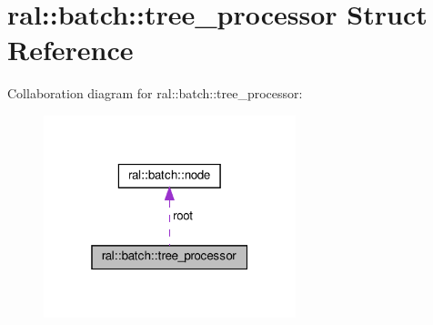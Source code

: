 \hypertarget{structral_1_1batch_1_1tree__processor}{}\section{ral\+:\+:batch\+:\+:tree\+\_\+processor Struct Reference}
\label{structral_1_1batch_1_1tree__processor}


Collaboration diagram for ral\+:\+:batch\+:\+:tree\+\_\+processor\+:\nopagebreak
\begin{figure}[H]
\begin{center}
\leavevmode
\includegraphics[width=208pt]{structral_1_1batch_1_1tree__processor__coll__graph}
\end{center}
\end{figure}
